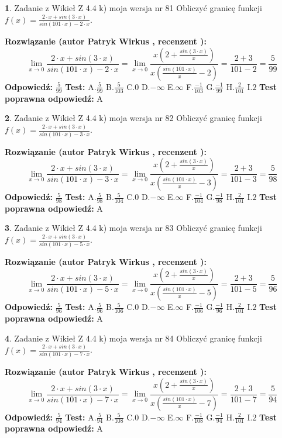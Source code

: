 \documentclass[12pt, a4paper]{article}
\theoremstyle{definition} %
\newtheorem{zad}{}
\newcommand{\zadStart}[1]{\begin{zad}#1\newline}
\newcommand{\zadStop}{\end{zad}}
\newcommand{\rozwStart}[2]{\noindent \textbf{Rozwiązanie (autor #1 , recenzent #2): }\newline}
\newcommand{\rozwStop}{\newline}
\newcommand{\odpStart}{\noindent \textbf{Odpowiedź:}\newline}
\newcommand{\odpStop}{\newline}
\newcommand{\testStart}{\noindent \textbf{Test:}\newline}
\newcommand{\testStop}{\newline}
\newcommand{\kluczStart}{\noindent \textbf{Test poprawna odpowiedź:}\newline}
\newcommand{\kluczStop}{\newline}
\begin{document}
\zadStart{Zadanie z Wikieł Z 4.4 k) moja wersja nr 81}
Obliczyć granicę funkcji $f(x)=\frac{2\cdot x +sin(3\cdot x)}{sin(101\cdot x) -2\cdot x}$.
\zadStop
\rozwStart{Patryk Wirkus}{}
$$\lim\limits_{x\to 0}\frac{2\cdot x +sin(3\cdot x)}{sin(101\cdot x) -2\cdot x}
=\lim\limits_{x\to 0}\frac{x(2+\frac{sin(3\cdot x)}{x})}{x(\frac{sin(101\cdot x)}{x}-2)}
=\frac{2+3}{101-2} = \frac{5}{99}$$
\rozwStop
\odpStart
$\frac{5}{99}$
\odpStop
\testStart
A.$\frac{5}{99}$
B.$\frac{5}{103}$
C.$0$
D.$-\infty$
E.$\infty$
F.$\frac{-1}{103}$
G.$\frac{-1}{99}$
H.$\frac{2}{101}$
I.$2$
\testStop
\kluczStart
A
\kluczStop



\zadStart{Zadanie z Wikieł Z 4.4 k) moja wersja nr 82}
Obliczyć granicę funkcji $f(x)=\frac{2\cdot x +sin(3\cdot x)}{sin(101\cdot x) -3\cdot x}$.
\zadStop
\rozwStart{Patryk Wirkus}{}
$$\lim\limits_{x\to 0}\frac{2\cdot x +sin(3\cdot x)}{sin(101\cdot x) -3\cdot x}
=\lim\limits_{x\to 0}\frac{x(2+\frac{sin(3\cdot x)}{x})}{x(\frac{sin(101\cdot x)}{x}-3)}
=\frac{2+3}{101-3} = \frac{5}{98}$$
\rozwStop
\odpStart
$\frac{5}{98}$
\odpStop
\testStart
A.$\frac{5}{98}$
B.$\frac{5}{104}$
C.$0$
D.$-\infty$
E.$\infty$
F.$\frac{-1}{104}$
G.$\frac{-1}{98}$
H.$\frac{2}{101}$
I.$2$
\testStop
\kluczStart
A
\kluczStop



\zadStart{Zadanie z Wikieł Z 4.4 k) moja wersja nr 83}
Obliczyć granicę funkcji $f(x)=\frac{2\cdot x +sin(3\cdot x)}{sin(101\cdot x) -5\cdot x}$.
\zadStop
\rozwStart{Patryk Wirkus}{}
$$\lim\limits_{x\to 0}\frac{2\cdot x +sin(3\cdot x)}{sin(101\cdot x) -5\cdot x}
=\lim\limits_{x\to 0}\frac{x(2+\frac{sin(3\cdot x)}{x})}{x(\frac{sin(101\cdot x)}{x}-5)}
=\frac{2+3}{101-5} = \frac{5}{96}$$
\rozwStop
\odpStart
$\frac{5}{96}$
\odpStop
\testStart
A.$\frac{5}{96}$
B.$\frac{5}{106}$
C.$0$
D.$-\infty$
E.$\infty$
F.$\frac{-1}{106}$
G.$\frac{-1}{96}$
H.$\frac{2}{101}$
I.$2$
\testStop
\kluczStart
A
\kluczStop



\zadStart{Zadanie z Wikieł Z 4.4 k) moja wersja nr 84}
Obliczyć granicę funkcji $f(x)=\frac{2\cdot x +sin(3\cdot x)}{sin(101\cdot x) -7\cdot x}$.
\zadStop
\rozwStart{Patryk Wirkus}{}
$$\lim\limits_{x\to 0}\frac{2\cdot x +sin(3\cdot x)}{sin(101\cdot x) -7\cdot x}
=\lim\limits_{x\to 0}\frac{x(2+\frac{sin(3\cdot x)}{x})}{x(\frac{sin(101\cdot x)}{x}-7)}
=\frac{2+3}{101-7} = \frac{5}{94}$$
\rozwStop
\odpStart
$\frac{5}{94}$
\odpStop
\testStart
A.$\frac{5}{94}$
B.$\frac{5}{108}$
C.$0$
D.$-\infty$
E.$\infty$
F.$\frac{-1}{108}$
G.$\frac{-1}{94}$
H.$\frac{2}{101}$
I.$2$
\testStop
\kluczStart
A
\kluczStop
\end{document}
